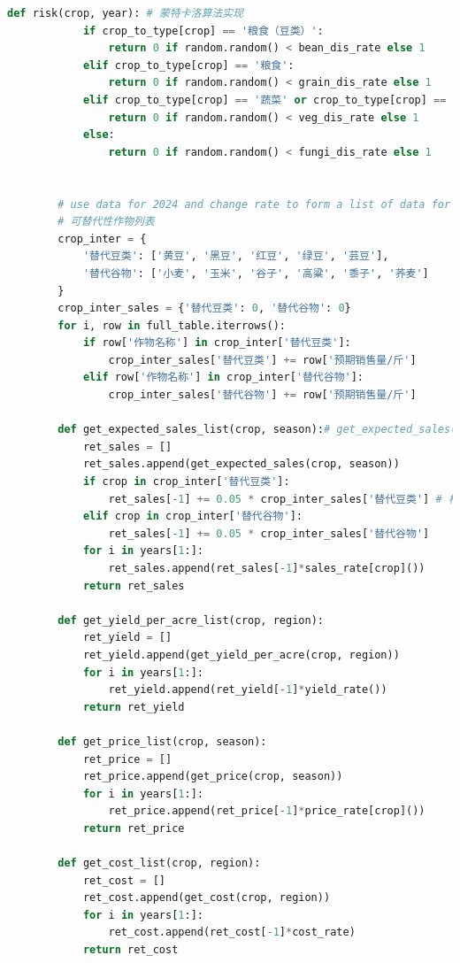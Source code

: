 \documentclass[withoutpreface]{cumcmthesis}
\begin{document}
\begin{appendices}
\begin{lstlisting}[language=python]
        def risk(crop, year): # 蒙特卡洛算法实现
            if crop_to_type[crop] == '粮食（豆类）':
                return 0 if random.random() < bean_dis_rate else 1
            elif crop_to_type[crop] == '粮食':
                return 0 if random.random() < grain_dis_rate else 1
            elif crop_to_type[crop] == '蔬菜' or crop_to_type[crop] == '蔬菜（豆类）':
                return 0 if random.random() < veg_dis_rate else 1
            else:
                return 0 if random.random() < fungi_dis_rate else 1
    
    
        # use data for 2024 and change rate to form a list of data for 2024-2030
        # 可替代性作物列表
        crop_inter = {
            '替代豆类': ['黄豆', '黑豆', '红豆', '绿豆', '芸豆'],
            '替代谷物': ['小麦', '玉米', '谷子', '高粱', '黍子', '荞麦']
        }
        crop_inter_sales = {'替代豆类': 0, '替代谷物': 0}
        for i, row in full_table.iterrows():
            if row['作物名称'] in crop_inter['替代豆类']:
                crop_inter_sales['替代豆类'] += row['预期销售量/斤']
            elif row['作物名称'] in crop_inter['替代谷物']:
                crop_inter_sales['替代谷物'] += row['预期销售量/斤']
        
        def get_expected_sales_list(crop, season):# get_expected_sales(crop, season)[year-2024]
            ret_sales = []
            ret_sales.append(get_expected_sales(crop, season))
            if crop in crop_inter['替代豆类']:
                ret_sales[-1] += 0.05 * crop_inter_sales['替代豆类'] # 相互可替代的作物拥有一部分可公用预期销售量
            elif crop in crop_inter['替代谷物']:
                ret_sales[-1] += 0.05 * crop_inter_sales['替代谷物']
            for i in years[1:]:
                ret_sales.append(ret_sales[-1]*sales_rate[crop]())
            return ret_sales
        
        def get_yield_per_acre_list(crop, region):
            ret_yield = []
            ret_yield.append(get_yield_per_acre(crop, region))
            for i in years[1:]:
                ret_yield.append(ret_yield[-1]*yield_rate())
            return ret_yield
        
        def get_price_list(crop, season):
            ret_price = []
            ret_price.append(get_price(crop, season))
            for i in years[1:]:
                ret_price.append(ret_price[-1]*price_rate[crop]())
            return ret_price
        
        def get_cost_list(crop, region):
            ret_cost = []
            ret_cost.append(get_cost(crop, region))
            for i in years[1:]:
                ret_cost.append(ret_cost[-1]*cost_rate)
            return ret_cost
        

\end{lstlisting}
\end{appendices}
\end{document}
